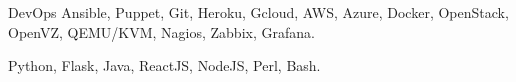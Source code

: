

\begin{cvskills}

  \cvskill
    {DevOps} %
    {Ansible, Puppet, Git, Heroku, Gcloud, AWS, Azure, Docker, OpenStack, OpenVZ, QEMU/KVM, Nagios, Zabbix, Grafana.} %

  \cvskill
    {
     } %
    {Python, Flask, Java, ReactJS, NodeJS, Perl, Bash.} %

  \cvskill
    {} %
    {} %
\end{cvskills}
